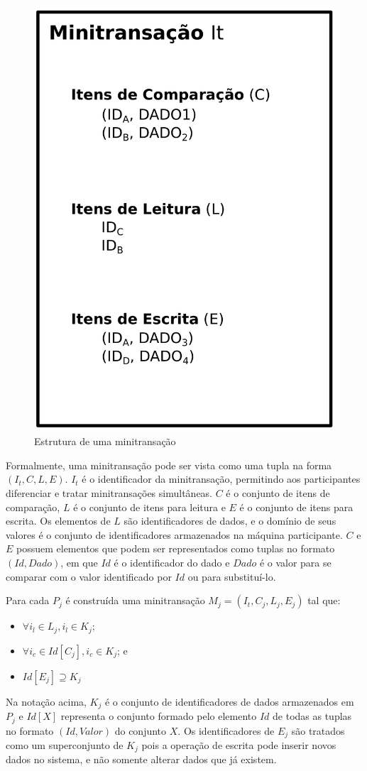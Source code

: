 \documentclass[11pt,twoside,a4paper]{book}
\begin{document}
\begin{figure}
  \centering
  \includegraphics[width=.40\textwidth]{estrutura_minitransacao} 
  \caption{Estrutura de uma minitransação}
  \label{fig:estrutura_minitransacao} 
\end{figure}

Formalmente, uma minitransação pode ser vista como uma tupla na forma $(I_t, C, L, E)$. $I_t$ é o identificador da minitransação, permitindo aos participantes diferenciar e tratar minitransações simultâneas. \(C\) é o conjunto de itens de comparação, \(L\) é o conjunto de itens para leitura e \(E\) é o conjunto de itens para escrita. Os elementos de \(L\) são identificadores de dados, e o domínio de seus valores é o conjunto de identificadores armazenados na máquina participante. \(C\) e \(E\) possuem elementos que podem ser representados como tuplas no formato \((Id, Dado)\), em que \(Id\) é o identificador do dado e \(Dado\) é o valor para se comparar com o valor identificado por $Id$ ou para substituí-lo.

Para cada \(P_j\) é construída uma minitransação \(M_j = (I_t, C_j, L_j, E_j)\) tal que:

\begin{itemize}
\item $\forall i_l \in L_j, i_l \in K_j$;
\item $\forall i_c \in Id[C_j], i_c \in K_j$; e
\item $Id[E_j] \supseteq K_j$
\end{itemize}

Na notação acima, $K_j$ é o conjunto de identificadores de dados armazenados em $P_j$ e $Id[X]$ representa o conjunto formado pelo elemento $Id$ de todas as tuplas no formato $(Id, Valor)$ do conjunto $X$. Os identificadores de $E_j$ são tratados como um superconjunto de $K_j$ pois a operação de escrita pode inserir novos dados no sistema, e não somente alterar dados que já existem.
\end{document}
